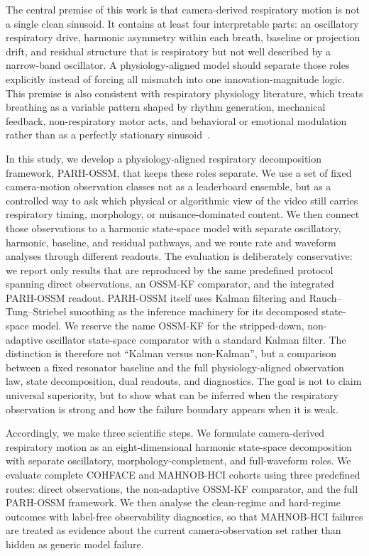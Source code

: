 \documentclass[fleqn,10pt]{wlscirep}
\begin{document}
The central premise of this work is that camera-derived respiratory motion is
not a single clean sinusoid. It contains at least four interpretable parts:
an oscillatory respiratory drive, harmonic asymmetry within each breath,
baseline or projection drift, and residual structure that is respiratory but
not well described by a narrow-band oscillator. A physiology-aligned model
should separate those roles explicitly instead of forcing all mismatch into one
innovation-magnitude logic. This premise is also consistent with respiratory
physiology literature, which treats breathing as a variable pattern shaped by
rhythm generation, mechanical feedback, non-respiratory motor acts, and
behavioral or emotional modulation rather than as a perfectly stationary
sinusoid~\cite{Oku2022,vanDenBosch2021}.

In this study, we develop a physiology-aligned respiratory decomposition
framework, PARH-OSSM, that keeps these roles separate. We use a set of fixed
camera-motion observation classes not as a leaderboard ensemble, but as a
controlled way to ask which physical or algorithmic view of the video still
carries respiratory timing, morphology, or nuisance-dominated content. We then
connect those observations to a harmonic state-space model with separate
oscillatory, harmonic, baseline, and residual pathways, and we route rate and
waveform analyses through different readouts. The evaluation is deliberately
conservative: we report only results that are reproduced by the same
predefined protocol spanning direct observations, an OSSM-KF comparator, and
the integrated PARH-OSSM readout. PARH-OSSM itself uses Kalman filtering and
Rauch--Tung--Striebel smoothing as the inference machinery for its decomposed
state-space model. We reserve the name OSSM-KF for the stripped-down,
non-adaptive oscillator state-space comparator with a standard Kalman filter.
The distinction is therefore
not ``Kalman versus non-Kalman'', but a comparison between a fixed resonator
baseline and the full physiology-aligned observation law, state decomposition,
dual readouts, and diagnostics. The goal is not to claim universal superiority,
but to show what can be inferred when the respiratory observation is strong and
how the failure boundary appears when it is weak.

Accordingly, we make three scientific steps. We formulate camera-derived
respiratory motion as an eight-dimensional harmonic state-space decomposition
with separate oscillatory, morphology-complement, and full-waveform roles. We
evaluate complete COHFACE and MAHNOB-HCI cohorts using three predefined
routes: direct observations, the non-adaptive OSSM-KF comparator, and the full
PARH-OSSM framework. We then analyse the clean-regime and hard-regime outcomes with label-free
observability diagnostics, so that MAHNOB-HCI failures are treated as evidence
about the current camera-observation set rather than hidden as generic model
failure.
\end{document}
